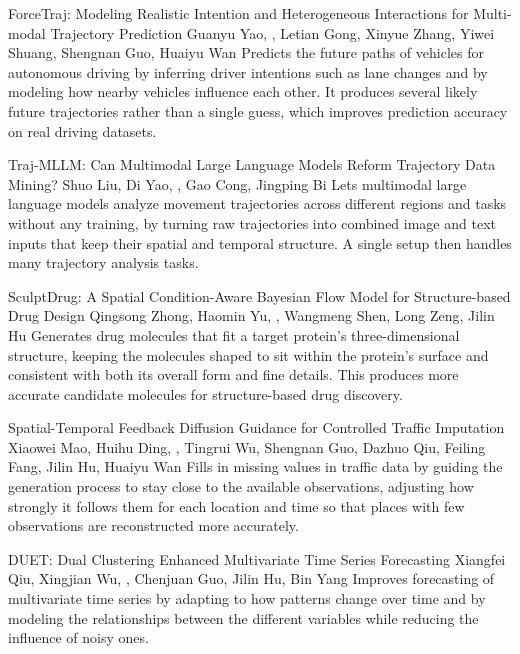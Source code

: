{ForceTraj: Modeling Realistic Intention and Heterogeneous Interactions for Multi-modal Trajectory Prediction}
{Guanyu Yao, \me, Letian Gong, Xinyue Zhang, Yiwei Shuang, Shengnan Guo, Huaiyu Wan}
{Predicts the future paths of vehicles for autonomous driving by inferring driver intentions such as lane changes and by modeling how nearby vehicles influence each other. It produces several likely future trajectories rather than a single guess, which improves prediction accuracy on real driving datasets.}

{Traj-MLLM: Can Multimodal Large Language Models Reform Trajectory Data Mining?}
{Shuo Liu, Di Yao, \me, Gao Cong, Jingping Bi}
{Lets multimodal large language models analyze movement trajectories across different regions and tasks without any training, by turning raw trajectories into combined image and text inputs that keep their spatial and temporal structure. A single setup then handles many trajectory analysis tasks.}

{SculptDrug: A Spatial Condition-Aware Bayesian Flow Model for Structure-based Drug Design}
{Qingsong Zhong, Haomin Yu, \me, Wangmeng Shen, Long Zeng, Jilin Hu}
{Generates drug molecules that fit a target protein's three-dimensional structure, keeping the molecules shaped to sit within the protein's surface and consistent with both its overall form and fine details. This produces more accurate candidate molecules for structure-based drug discovery.}

{Spatial-Temporal Feedback Diffusion Guidance for Controlled Traffic Imputation}
{Xiaowei Mao, Huihu Ding, \me, Tingrui Wu, Shengnan Guo, Dazhuo Qiu, Feiling Fang, Jilin Hu, Huaiyu Wan}
{Fills in missing values in traffic data by guiding the generation process to stay close to the available observations, adjusting how strongly it follows them for each location and time so that places with few observations are reconstructed more accurately.}

{DUET: Dual Clustering Enhanced Multivariate Time Series Forecasting}
{Xiangfei Qiu, Xingjian Wu, \me, Chenjuan Guo, Jilin Hu, Bin Yang}
{Improves forecasting of multivariate time series by adapting to how patterns change over time and by modeling the relationships between the different variables while reducing the influence of noisy ones.}

